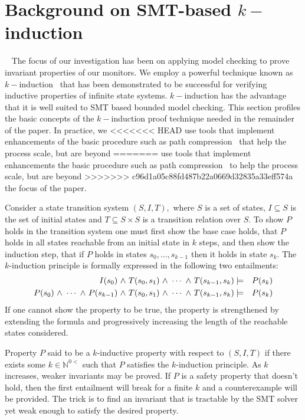 \section{Background on SMT-based $k-$induction}~\label{sec:background} 
The focus of our  investigation has  been on applying model checking to  prove
invariant properties of our monitors.   We  
employ a powerful technique known as $k-$induction~\cite{Sheeran00,
  EenS03} that has been demonstrated to be successful for verifying inductive
properties of infinite state systems.   $k-$induction  has the
advantage that it is well suited  to  SMT 
based bounded model checking. This section profiles the
basic concepts of the  $k-$induction proof technique needed in the
remainder of the paper. In practice, we
<<<<<<< HEAD
use tools that implement  enhancements of the basic procedure such as path
compression~\cite{dMRS03} that help the process scale, but are beyond
=======
use tools that implement  enhancements the basic procedure such as path
compression~\cite{dMRS03} to help the process scale, but are beyond
>>>>>>> c96d1a05c88fd487b22a0669d32835a33eff574a
the focus of the paper. 

Consider  a state transition system  $(S,I,T),$
where $S$ is a set of states, $I \subseteq S$ is the set of initial
states and $T \subseteq S \times S $ is a transition relation over
$S.$ To show $P$ holds in the transition system one must first
show the base case holds, that  $P$ holds in all states reachable
from an initial state in $k$ steps, and then show the induction step,
that if $P$ holds in states $s_0,\ldots,s_{k-1}$ then it holds in
state $s_k.$ The $k$-induction principle is formally expressed in the
following two entailments:
\begin{eqnarray*}
I(s_0) {\ \wedge \ } T(s_0,s_1) {\ \wedge \ } \cdots {\ \wedge \ } T(s_{k-1},s_k) &\models&
P(s_k) \\
P(s_0) {\ \wedge \ } \cdots {\ \wedge \ } P(s_{k-1}) {\ \wedge \ } T(s_0,s_1) {\ \wedge \ } \cdots {\ \wedge \ } T(s_{k-1},s_k) &\models&
P(s_k) 
\end{eqnarray*} 
If one cannot show the property to be true, the
property is strengthened by extending the formula and
progressively increasing the length of the reachable states
considered.  

Property $P$ said to be a $k$-inductive property with respect to
$(S,I,T)$ if there exists some $k \in \mathbb{N}^{0<}$ such that $P$
satisfies the $k$-induction principle. As $k$ increases, weaker
invariants may be proved. If $P$ is a safety property that doesn't hold, then the first entailment will break for a finite $k$ and a counterexample will be provided. The trick is to find an invariant that is
tractable by the SMT solver yet weak enough to satisfy the desired
property.  

